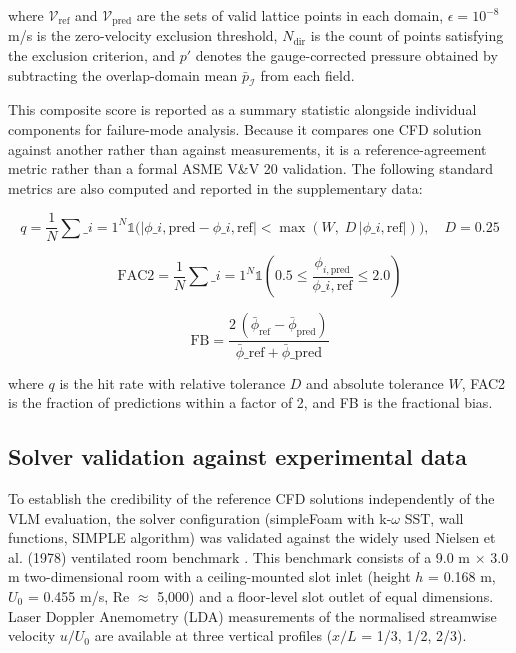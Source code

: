 \documentclass[preprint,12pt,number]{elsarticle}
\begin{document}
where $\mathcal{V}_\text{ref}$ and $\mathcal{V}_\text{pred}$ are the sets of valid lattice points in each domain, $\epsilon = 10^{-8}$ m/s is the zero-velocity exclusion threshold, $N_\text{dir}$ is the count of points satisfying the exclusion criterion, and $p'$ denotes the gauge-corrected pressure obtained by subtracting the overlap-domain mean $\bar{p}_{\mathcal{I}}$ from each field.

This composite score is reported as a summary statistic alongside individual components for failure-mode analysis. Because it compares one CFD solution against another rather than against measurements, it is a reference-agreement metric rather than a formal ASME V\&V 20 validation. The following standard metrics \cite{franke.etal2011COST732} are also computed and reported in the supplementary data:

\begin{equation}
q = \frac{1}{N}\sum\_{i=1}^{N} \mathbb{1}\!\bigl(|\phi\_{i,\text{pred}} - \phi\_{i,\text{ref}}| < \max(W,\; D\,|\phi\_{i,\text{ref}}|)\bigr), \quad D = 0.25
\label{eq:hit-rate}
\end{equation}

\begin{equation}
\text{FAC2} = \frac{1}{N}\sum\_{i=1}^{N} \mathbb{1}\!\left(0.5 \leq \frac{\phi_{i,\text{pred}}}{\phi\_{i,\text{ref}}} \leq 2.0\right)
\label{eq:fac2}
\end{equation}

\begin{equation}
\text{FB} = \frac{2\,(\bar{\phi}_\text{ref} - \bar{\phi}_\text{pred})}{\bar{\phi}\_\text{ref} + \bar{\phi}\_\text{pred}}
\label{eq:fractional-bias}
\end{equation}

where $q$ is the hit rate with relative tolerance $D$ and absolute tolerance $W$, FAC2 is the fraction of predictions within a factor of 2, and FB is the fractional bias.

\subsection{Solver validation against experimental data}
\label{sec:solver-validation-against-experimental-data}


To establish the credibility of the reference CFD solutions independently of the VLM evaluation, the solver configuration (simpleFoam with k-$\omega$ SST, wall functions, SIMPLE algorithm) was validated against the widely used Nielsen et al. (1978) ventilated room benchmark \cite{nielsen.etal1978VelocityCharacteristics}. This benchmark consists of a 9.0 m $\times$ 3.0 m two-dimensional room with a ceiling-mounted slot inlet (height $h$ = 0.168 m, $U_0$ = 0.455 m/s, Re $\approx$ 5,000) and a floor-level slot outlet of equal dimensions. Laser Doppler Anemometry (LDA) measurements of the normalised streamwise velocity $u/U_0$ are available at three vertical profiles ($x/L$ = 1/3, 1/2, 2/3).
\end{document}
